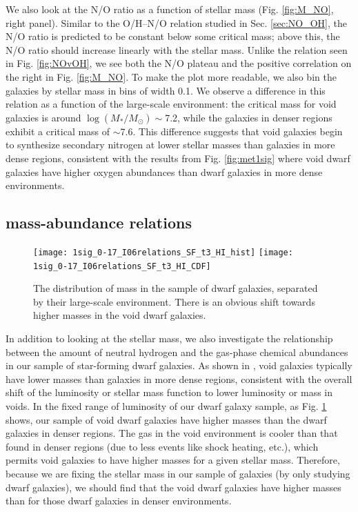 We also look at the N/O ratio as a function of stellar mass (Fig. 
\ref{fig:M_NO}, right panel).  Similar to the O/H--N/O relation studied in Sec. 
\ref{sec:NO_OH}, the N/O ratio is predicted to be constant below some critical 
mass; above this, the N/O ratio should increase linearly with the stellar mass.  
Unlike the relation seen in Fig. \ref{fig:NOvOH}, we see both the N/O plateau 
and the positive correlation on the right in Fig. \ref{fig:M_NO}.  To make the 
plot more readable, we also bin the galaxies by stellar mass in bins of width 
0.1.  We observe a difference in this relation as a function of the large-scale 
environment: the critical mass for void galaxies is around 
$\log(M_*/M_\odot) \sim$7.2, while the galaxies in denser regions exhibit a 
critical mass of $\sim$7.6.  This difference suggests that void galaxies begin 
to synthesize secondary nitrogen at lower stellar masses than galaxies in more 
dense regions, consistent with the results from Fig. \ref{fig:met1sig} where 
void dwarf galaxies have higher oxygen abundances than dwarf galaxies in more 
dense environments.


\subsection{ mass-abundance relations}

\begin{figure}
    \centering
    \texttt{[image: 1sig\_0-17\_I06relations\_SF\_t3\_HI\_hist]}
    \texttt{[image: 1sig\_0-17\_I06relations\_SF\_t3\_HI\_CDF]}
    \caption{The distribution of  mass in the sample of dwarf 
    galaxies, separated by their large-scale environment.  There is an obvious 
    shift towards higher  masses in the void dwarf galaxies.}
    \label{fig:HI_hist}
\end{figure}

In addition to looking at the stellar mass, we also investigate the relationship 
between the amount of neutral hydrogen and the gas-phase chemical abundances in 
our sample of star-forming dwarf galaxies.  As shown in \cite{Moorman14}, void 
galaxies typically have lower  masses than galaxies in more dense 
regions, consistent with the overall shift of the luminosity or stellar mass 
function to lower luminosity or mass in voids.  In the fixed range of luminosity 
of our dwarf galaxy sample, as Fig. \ref{fig:HI_hist} shows, our sample of void 
dwarf galaxies have higher  masses than the dwarf galaxies in denser 
regions.  The gas in the void environment is cooler than that found in denser 
regions (due to less events like shock heating, etc.), which permits void 
galaxies to have higher  masses for a given stellar mass.  Therefore, 
because we are fixing the stellar mass in our sample of galaxies (by only 
studying dwarf galaxies), we should find that the void dwarf galaxies have 
higher  masses than for those dwarf galaxies in denser environments.

